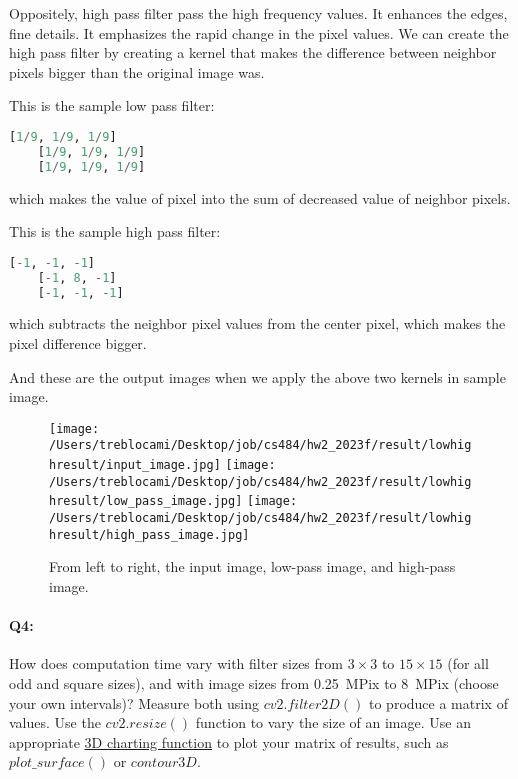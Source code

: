 	Oppositely, high pass filter pass the high frequency values. It enhances the edges, fine details. It emphasizes the rapid change in the pixel values.
	We can create the high pass filter by creating a kernel that makes the difference between neighbor pixels bigger than the original image was.

	This is the sample low pass filter:
	\begin{lstlisting}[language={python}]
	[1/9, 1/9, 1/9]
	[1/9, 1/9, 1/9]
	[1/9, 1/9, 1/9]
	\end{lstlisting}
	which makes the value of pixel into the sum of decreased value of neighbor pixels.

	This is the sample high pass filter:
	\begin{lstlisting}[language={python}]
	[-1, -1, -1]
	[-1, 8, -1]
	[-1, -1, -1]
	\end{lstlisting}
	
	which subtracts the neighbor pixel values from the center pixel, which makes the pixel difference bigger.

	And these are the output images when we apply the above two kernels in sample image.

	\begin{figure*}[b]
		\centering
		\texttt{[image: /Users/treblocami/Desktop/job/cs484/hw2\_2023f/result/lowhighresult/input\_image.jpg]}
		\texttt{[image: /Users/treblocami/Desktop/job/cs484/hw2\_2023f/result/lowhighresult/low\_pass\_image.jpg]}
		\texttt{[image: /Users/treblocami/Desktop/job/cs484/hw2\_2023f/result/lowhighresult/high\_pass\_image.jpg]}
		\caption{From left to right, the input image, low-pass image, and high-pass image.}
	\end{figure*}
	
	
	\pagebreak
	\paragraph{Q4:} How does computation time vary with filter sizes from $3\times3$ to $15\times15$ (for all odd and square sizes), and with image sizes from 0.25~MPix to 8~MPix (choose your own intervals)? Measure both using \href{https://docs.opencv.org/4.5.0/d4/d86/group__imgproc__filter.html#ga27c049795ce870216ddfb366086b5a04}{$cv2.filter2D()$} to produce a matrix of values. Use the \href{https://docs.opencv.org/4.5.3/da/d54/group__imgproc__transform.html#ga47a974309e9102f5f08231edc7e7529d}{$cv2.resize()$} function to vary the size of an image.
	Use an appropriate \href{https://jakevdp.github.io/PythonDataScienceHandbook/04.12-three-dimensional-plotting.html#Three-dimensional-Contour-Plots}{3D charting function} to plot your matrix of results, such as $plot\_surface()$ or $contour3D$.
	
